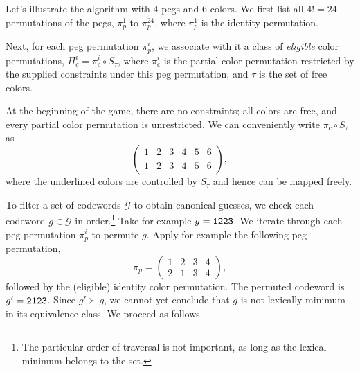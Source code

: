Let's illustrate the algorithm with 4 pegs and 6 colors. We first list all $4! = 24$ permutations of the pegs, $\pi_p^1$ to $\pi_p^{24}$, where $\pi_p^1$ is the identity permutation.

Next, for each peg permutation $\pi_p^i$, we associate with it a class of \emph{eligible} color permutations, $\Pi_c^i = \pi_c^i \circ S_\tau$, where $\pi_c^i$ is the partial color permutation restricted by the supplied constraints under this peg permutation, and $\tau$ is the set of free colors. 

At the beginning of the game, there are no constraints; all colors are free, and every partial color permutation is unrestricted. We can conveniently write $\pi_c \circ S_\tau$ as
\[
\begin{pmatrix}
\underline{1} & \underline{2} & \underline{3} & \underline{4} & \underline{5} & \underline{6} \\
\underline{1} & \underline{2} & \underline{3} & \underline{4} & \underline{5} & \underline{6} 
\end{pmatrix} ,
\]
where the underlined colors are controlled by $S_\tau$ and hence can be mapped freely.

To filter a set of codewords $\mathcal{G}$ to obtain canonical guesses, we check each codeword $g \in \mathcal{G}$ in order.\footnote{The particular order of traversal is not important, as long as the lexical minimum belongs to the set.} 
Take for example $g = \texttt{1223}$. We iterate through each peg permutation $\pi_p^i$ to permute $g$. Apply for example the following peg permutation,
\[
\pi_p = 
\begin{pmatrix}
1 & 2 & 3 & 4 \\
2 & 1 & 3 & 4
\end{pmatrix} ,
\]
followed by the (eligible) identity color permutation.
The permuted codeword is $g' = \texttt{2123}$. Since $g' \succ g$, we cannot yet conclude that $g$ is not lexically minimum in its equivalence class. We proceed as follows.

